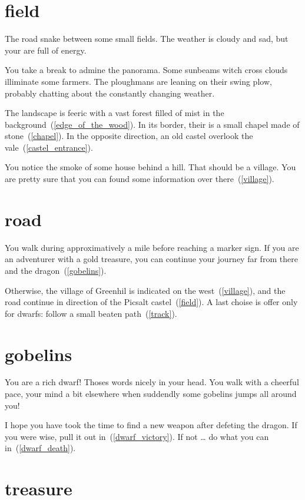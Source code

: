 
\section{field}

The road snake between some small fields. The weather is cloudy and sad, but
your are full of energy.

You take a break to admine the panorama. Some sunbeams witch cross clouds
illiminate some farmers. The ploughmans are leaning on their swing plow,
probably chatting about the constantly changing weather.

The landscape is feeric with a vast forest filled of mist in the
background~(\ref{edge_of_the_wood}). In its border, their is a small chapel made
of stone~(\ref{chapel}). In the opposite direction, an old castel overlook the
vale~(\ref{castel_entrance}).

You notice the smoke of some house behind a hill. That should be a village. You
are pretty sure that you can found some information over there~(\ref{village}).

\section{road}

You walk during approximatively a mile before reaching a marker sign. If you are
an adventurer with a gold treasure, you can continue your journey far from there and
the dragon~(\ref{gobelins}).

Otherwise, the village of Greenhil is indicated on the west~(\ref{village}), and
the road continue in direction of the Picsalt castel~(\ref{field}). A last
choise is offer only for dwarfs: follow a small beaten path~(\ref{track}).

\section{gobelins}

You are a rich dwarf! Thoses words nicely in your head. You walk with a cheerful
pace, your mind a bit elsewhere when suddendly some gobelins jumps all around
you!

I hope you have took the time to find a new weapon after defeting the dragon. If
you were wise, pull it out in~(\ref{dwarf_victory}). If not … do what you can
in~(\ref{dwarf_death}).

\section{treasure}

